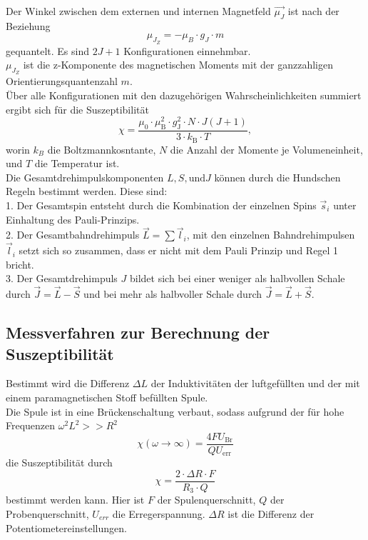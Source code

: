Der Winkel zwischen dem externen und internen Magnetfeld $\vec{\mu_J}$ ist nach der Beziehung
\begin{equation*}
    \mu_{J_Z} = - \mu_B \cdot g_J \cdot m
\end{equation*}
gequantelt. Es sind $2J+1$ Konfigurationen einnehmbar.\\
$\mu_{J_Z}$ ist die z-Komponente des magnetischen Moments mit der ganzzahligen Orientierungsquantenzahl
$m$.\\
Über alle Konfigurationen mit den dazugehörigen Wahrscheinlichkeiten summiert
ergibt sich für die Suszeptibilität 
\begin{equation}
    \chi = \frac{\mu_0 \cdot \mu_{\text{B}}^2 \cdot g_{\text{J}}^2 \cdot N \cdot  J (J+1)}{3 \cdot k_{\text{B}} \cdot T},
    \label{eq:sus}
\end{equation} 
worin $k_B$ die Boltzmannkosntante, $N$ die Anzahl der Momente je Volumeneinheit,
und $T$ die Temperatur ist.\\
Die Gesamtdrehimpulskomponenten $L, S, \textrm{und} J$ können durch die Hundschen Regeln bestimmt werden. Diese sind:\\
1. Der Gesamtspin entsteht durch die Kombination der einzelnen Spins $\vec s_{i}$ unter Einhaltung des Pauli-Prinzips.\\
2. Der Gesamtbahndrehimpuls $\vec L =\sum \vec l_{i}$, mit den einzelnen Bahndrehimpulsen $\vec l_{i}$ setzt sich so zusammen, dass er nicht mit dem Pauli Prinzip und Regel 1 bricht. \\
3. Der Gesamtdrehimpuls $J$ bildet sich bei einer weniger als halbvollen Schale durch $\vec J=\vec L - \vec S$ und bei mehr als halbvoller Schale durch $\vec J =\vec L + \vec S$.


\subsection{Messverfahren zur Berechnung der Suszeptibilität}

Bestimmt wird die Differenz $\Delta L$ der Induktivitäten
der luftgefüllten und der mit einem paramagnetischen Stoff befüllten Spule.\\
Die Spule ist in eine Brückenschaltung verbaut, sodass aufgrund der  für hohe Frequenzen $\omega^2 L^2 >> R^2$
\begin{equation}
    \chi (\omega \to \infty) = \frac{4 F U_\text{Br}}{Q U_\text{err}}
    \label{eq:1}
\end{equation}
die Suszeptibilität durch
\begin{equation}
    \chi = \frac{2 \cdot \Delta R \cdot F}{R_3\cdot Q}
    \label{eq:alternativ}
\end{equation}
bestimmt werden kann. Hier ist $F$ der Spulenquerschnitt, $Q$ der 
Probenquerschnitt, $U_{err}$ die Erregerspannung. $\Delta R$ ist die Differenz der Potentiometereinstellungen.\\


